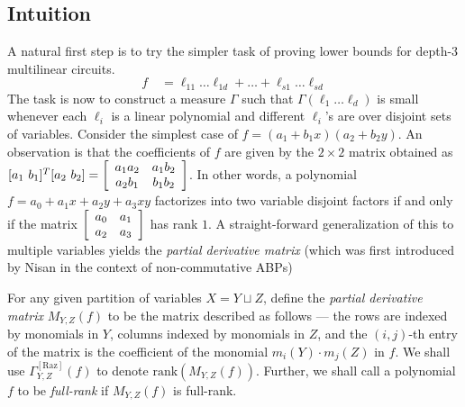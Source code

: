 \subsection*{Intuition}

A natural first step is to try the simpler task of proving lower bounds for depth-$3$ multilinear circuits. 
$$
f \quad = \ell_{11} \dots \ell_{1d} + \dots + \ell_{s1}\dots \ell_{sd}
$$
The task is now to construct a measure $\Gamma$ such that $\Gamma(\ell_1\dots \ell_d)$ is small whenever each $\ell_i$ is a linear polynomial and different $\ell_i$'s are over disjoint sets of variables. 
Consider the simplest case of $f = (a_1  + b_1x)(a_2  + b_2y)$. 
An observation is that the coefficients of $f$ are given by the $2\times 2$ matrix obtained as $[a_1\ b_1]^T [a_2\ b_2] = \left[\begin{array}{cc} a_1a_2 & a_1b_2\\ a_2 b_1 & b_1 b_2\end{array}\right]$. 
In other words, a polynomial $f = a_0 + a_1x + a_2y + a_3xy$ factorizes into two variable disjoint factors if and only if the matrix $\left[\begin{array}{cc} a_0 & a_1\\ a_2 & a_3\end{array}\right]$ has rank $1$. 
A straight-forward generalization of this to multiple variables yields the \emph{partial derivative matrix} (which was first introduced by Nisan \cite{nis91} in the context of non-commutative ABPs)\\

\begin{definition}
For any given partition of variables $X = Y \sqcup Z$, define the \emph{partial derivative matrix} $M_{Y,Z}(f)$ to be the matrix described as follows --- the rows are indexed by monomials in $Y$, columns indexed by monomials in $Z$, and the $(i,j)$-th entry of the matrix is the coefficient of the monomial $m_i(Y)\cdot m_j(Z)$ in $f$. 
We shall use $\Gamma^{\mathrm{[Raz]}}_{Y,Z}(f)$ to denote $\mathrm{rank}(M_{Y,Z}(f))$. 
Further, we shall call a polynomial $f$ to be \emph{full-rank} if $M_{Y,Z}(f)$ is full-rank.
\end{definition}



